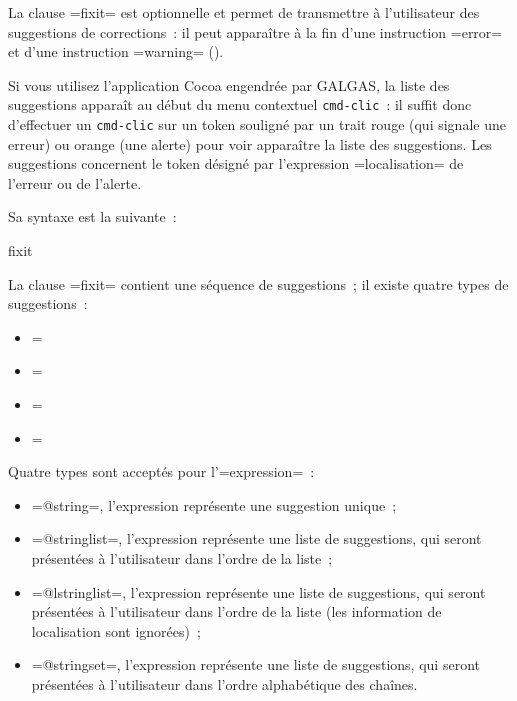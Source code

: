 
La clause \ggs=fixit= est optionnelle et permet de transmettre à l'utilisateur des suggestions de corrections~: il peut apparaître à la fin d'une instruction \ggs=error= et d'une instruction \ggs=warning= ().

Si vous utilisez l'application Cocoa engendrée par GALGAS, la liste des suggestions apparaît au début du menu contextuel \texttt{cmd-clic}~: il suffit donc d'effectuer un \texttt{cmd-clic} sur un token souligné par un trait rouge (qui signale une erreur) ou orange (une alerte) pour voir apparaître la liste des suggestions. Les suggestions concernent le token désigné par l'expression \ggs=localisation= de l'erreur ou de l'alerte.

Sa syntaxe est la suivante~:

\begin{galgas}
fixit {
}
\end{galgas}

La clause \ggs=fixit= contient une séquence de suggestions~; il existe quatre types de suggestions~:
\begin{itemize}
\item \ggs=%
\item \ggs=%
\item \ggs=%
\item \ggs=%
\end{itemize}

Quatre types sont acceptés pour l'\ggs=expression=~:
\begin{itemize}
  \item \ggs=@string=, l'expression représente une suggestion unique~;
  \item \ggs=@stringlist=, l'expression représente une liste de suggestions, qui seront présentées à l'utilisateur dans l'ordre de la liste~;
  \item \ggs=@lstringlist=, l'expression représente une liste de suggestions, qui seront présentées à l'utilisateur dans l'ordre de la liste (les information de localisation sont ignorées)~;
  \item \ggs=@stringset=, l'expression représente une liste de suggestions, qui seront présentées à l'utilisateur dans l'ordre alphabétique des chaînes.
\end{itemize}

